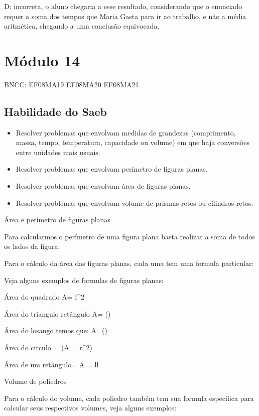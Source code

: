 D: incorreta, o aluno chegaria a esse resultado, considerando que o
enunciado requer a soma dos tempos que Maria Gasta para ir ao trabalho,
e não a média aritmética, chegando a uma conclusão equivocada.

\chapter{Módulo 14}

BNCC: EF08MA19 EF08MA20 EF08MA21

\section{Habilidade do Saeb}

\begin{itemize}

\item 
  Resolver problemas que envolvam medidas de grandezas (comprimento,
  massa, tempo, temperatura, capacidade ou volume) em que haja
  conversões entre unidades mais usuais.

\item 
  Resolver problemas que envolvam perímetro de figuras planas.

\item 
  Resolver problemas que envolvam área de figuras planas.

\item 
  Resolver problemas que envolvam volume de prismas retos ou cilindros
  retos.
\end{itemize}

Área e perímetro de figuras planas

Para calcularmos o perímetro de uma figura plana basta realizar a soma
de todos os lados da figura.

Para o cálculo da área das figuras planas, cada uma tem uma formula
particular:

Veja alguns exemplos de formulas de figuras planas:

Área do quadrado A= l^2

Área do triangulo retângulo A= ()

Área do losango temos que: A=()=

Área do circulo = (A = \pi r^{2})

Área de um retângulo= A = l\times l

Volume de poliedros

Para o cálculo do volume, cada poliedro também tem sua formula
específica para calcular seus respectivos volumes, veja alguns exemplos:

